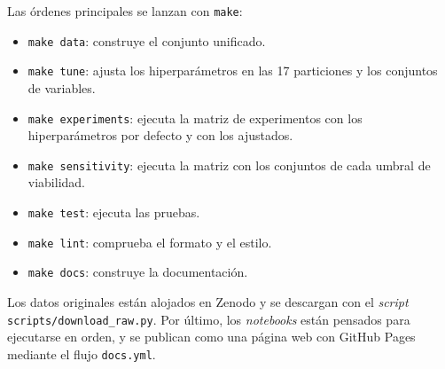 Las órdenes principales se lanzan con \texttt{make}:

\begin{itemize}
  \item \texttt{make data}: construye el conjunto unificado.
  \item \texttt{make tune}: ajusta los hiperparámetros en las 17 particiones y los conjuntos de variables.
  \item \texttt{make experiments}: ejecuta la matriz de experimentos con los hiperparámetros por defecto y con los ajustados.
  \item \texttt{make sensitivity}: ejecuta la matriz con los conjuntos de cada umbral de viabilidad.
  \item \texttt{make test}: ejecuta las pruebas.
  \item \texttt{make lint}: comprueba el formato y el estilo.
  \item \texttt{make docs}: construye la documentación.
\end{itemize}

Los datos originales están alojados en Zenodo y se descargan con el \textit{script} \texttt{scripts/\allowbreak download\_\allowbreak raw.py}. Por último, los \textit{notebooks} están pensados para ejecutarse en orden, y se publican como una página web con GitHub Pages mediante el flujo \texttt{docs.yml}.
\\

